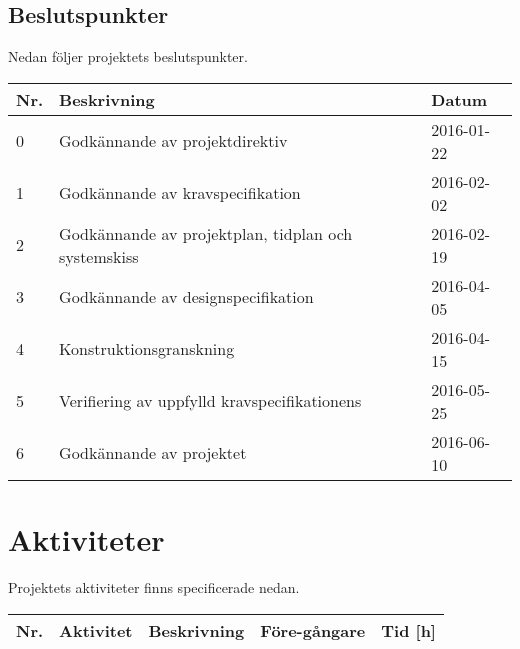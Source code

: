 \documentclass[11pt]{article}
\begin{document}
\begin{flushleft}
\begin{longtable}{| p{.05\linewidth} | p{.7\linewidth} | p{.15\linewidth} |}
\end{longtable}

\subsection{Beslutspunkter}
Nedan följer projektets beslutspunkter.

\begin{longtable}{| p{.05\linewidth} | p{.7\linewidth} | p{.15\linewidth} |} \hline
\textbf{Nr.} & \textbf{Beskrivning} & \textbf{Datum} \\ \hline
0 & Godkännande av projektdirektiv & 2016-01-22 \\ \hline
1 & Godkännande av kravspecifikation & 2016-02-02 \\ \hline
2 & Godkännande av projektplan, tidplan och systemskiss & 2016-02-19 \\ \hline
3 & Godkännande av designspecifikation & 2016-04-05 \\ \hline
4 & Konstruktionsgranskning & 2016-04-15 \\ \hline
5 & Verifiering av uppfylld kravspecifikationens & 2016-05-25 \\ \hline
6 & Godkännande av projektet & 2016-06-10 \\ \hline

\end{longtable}

\pagebreak
\section{Aktiviteter}
Projektets aktiviteter finns specificerade nedan. 
\begin{longtable}{| p{.05\linewidth} | p{.25\linewidth} | p{.4\linewidth} | p{.1\linewidth} | p{.05\linewidth} |} \hline

\textbf{Nr.} & \textbf{Aktivitet} & \textbf{Beskrivning} & \textbf{Före-gångare} & \textbf{Tid [h]} \\ \hline \endhead


\end{longtable}
\end{flushleft}
\end{document}
